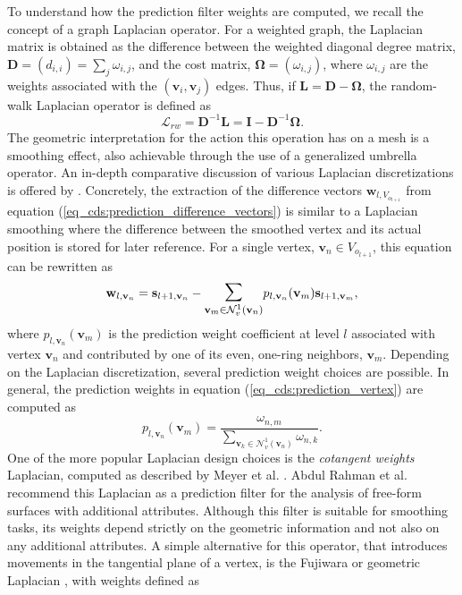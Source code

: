 \documentclass[graybox]{svmult}
\begin{document}
	
	To understand how the prediction filter weights are computed, we recall the concept of a graph Laplacian operator. For a weighted graph, the Laplacian matrix is obtained as the difference between the weighted diagonal degree matrix, $\mathbf{D} = (d_{i,i}) = \sum_{j}{\omega_{i,j}}$, and the cost matrix, $\bm{\Omega} = (\omega_{i,j})$,
	where $\omega_{i,j}$ are the weights associated with the $(\mathbf{v}_i,\mathbf{v}_j)$ edges. Thus, if $\mathbf{L} = \mathbf{D} -  \bm{\Omega}$, the random-walk Laplacian operator is defined as
	\begin{equation}
	\mathcal{L}_{rw} = \mathbf{D}^{-1} \mathbf{L} =  \mathbf{I} - \mathbf{D}^{-1} \bm{\Omega}.
	\label{eq_cds:random_walk_laplacian}
	\end{equation}
	The geometric interpretation for the action this operation has on a mesh is a smoothing effect, also achievable through the use of a generalized umbrella operator.  An in-depth comparative discussion of various Laplacian discretizations  is offered by \cite{Wardetzky2007}. Concretely, the extraction of the difference vectors $\mathbf{w}_{l,V_{o_{l+1}}}$ from equation (\ref{eq_cds:prediction_difference_vectors}) is similar to a Laplacian smoothing where
	the difference between the smoothed vertex and its actual position is stored for later reference. For a single vertex, $\mathbf{v}_n \in V_{o_{l+1}}$, this equation can be rewritten as
	\begin{equation}
	\mathbf{w}_{l, \mathbf{v}_n} = \mathbf{s}_{l+1,\mathbf{v}_n} - \mathlarger{\mathlarger{\sum}}_{\mathbf{v}_m \in \mathcal{N}_v^1(\mathbf{v}_n)}{ p_{l, \mathbf{v}_n}(\mathbf{v}_m)  \mathbf{s}_{l+1,\mathbf{v}_m} },
	\label{eq_cds:prediction_vertex}
	\end{equation}
	where $p_{l, \mathbf{v}_n}(\mathbf{v}_m)$ is the prediction weight coefficient at level $l$ associated with vertex $\mathbf{v}_n$ and contributed by one of its even, one-ring neighbors, $\mathbf{v}_m$. Depending on the Laplacian discretization, several prediction weight choices are possible. In general, the prediction weights in equation (\ref{eq_cds:prediction_vertex}) are computed as
	\begin{equation}
	p_{l, \mathbf{v}_n}(\mathbf{v}_m) = \frac{ \omega_{n,m} } { \sum_{\mathbf{v}_k \in \mathcal{N}_v^1(\mathbf{v}_n)} { \omega_{n,k } }}.
	\label{eq_cds:prediction_weight}
	\end{equation}
	One of the more popular Laplacian design choices is the \emph{cotangent weights} Laplacian, computed as described by Meyer et al. \cite{Meyer2003}. Abdul Rahman et al. \cite{AbdulRahman2013} recommend this Laplacian as a prediction filter for the analysis of free-form surfaces with additional attributes. Although this filter is suitable for smoothing tasks, its weights depend strictly on the geometric information and not also on any additional attributes. A simple alternative for this operator, that introduces movements in the tangential plane of a vertex, is the Fujiwara or geometric Laplacian \cite{Fujiwara95}, with weights defined as
\end{document}
